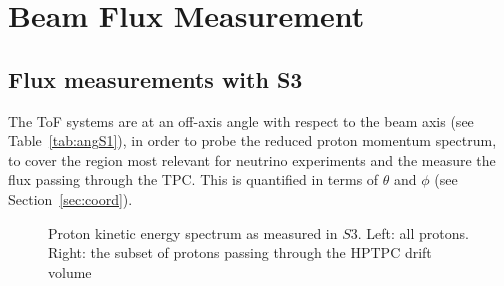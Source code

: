 \section{Beam Flux Measurement}
\label{hptpcPaper:sec:Results}

\subsection{Flux measurements with S3}

The ToF systems are at an off-axis angle with respect to the beam axis (see Table~\ref{tab:angS1}), in order to probe the reduced proton momentum spectrum, to cover the region most relevant for neutrino experiments and the measure the flux passing through the TPC.
This is quantified in terms of $\theta$ and $\phi$ (see Section~\ref{sec:coord}).

\begin{figure}[ht]
  \centering
  \begin{minipage}[t]{0.49\textwidth}
    \begin{adjustbox}{max totalsize={\textwidth}, center}
      
    \end{adjustbox}
  \end{minipage}
  \hfill
  \begin{minipage}[t]{0.49\textwidth}
    \begin{adjustbox}{max totalsize={\textwidth}, center}
      
    \end{adjustbox}
  \end{minipage}
  \caption{\label{fig:s3proke}Proton kinetic energy spectrum as measured in $\mathit{S3}$. Left: all protons. Right: the subset of protons passing through the HPTPC drift volume}
\end{figure}

%      


